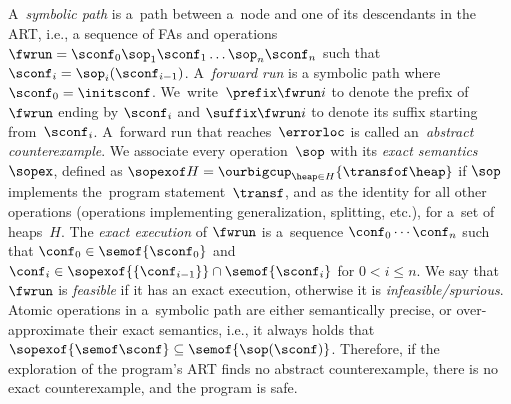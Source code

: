 A~\emph{symbolic path} is a~path between a~node and one of its
descendants in the ART, i.e., a sequence of FAs and operations
$\fwrun = \sconf_0 \sop_1 \sconf_1 \ldots \sop_n \sconf_n$
such that $\sconf_i = \sop_i(\sconf_{i-1})$.
A~\emph{forward run} is a symbolic path where $\sconf_0 = \initsconf$.
We~write~$\prefix \fwrun i$ to denote the prefix of~$\fwrun$ ending by $\sconf_i$ and 
$\suffix \fwrun i$ to denote its suffix starting from~$\sconf_i$. 
%
A~forward run that reaches~$\errorloc$ is called an~\emph{abstract
counterexample}.
We associate every operation~$\sop$ with its \emph{exact semantics} $\sopex$,
defined as $\sopexof H = \ourbigcup_{\heap \in H}\{\transfof \heap\}$
if $\sop$ implements the~program statement~$\transf$,
and as the identity for all other operations (operations implementing
generalization, splitting, etc.), for a~set of heaps~$H$.
%
The \emph{exact execution} of $\fwrun$ is a~sequence $\conf_0\cdots\conf_n$
such that 
$\conf_0\in \semof{\sconf_0}$ and    
$\conf_i\in\sopexof{\{\conf_{i-1}\}}\cap\semof{\sconf_i}$ for $0 < i\leq n$.
%
We say that $\fwrun$ is \emph{feasible} if it has an exact execution, 
otherwise it is \emph{infeasible/spurious}.
Atomic operations in a~symbolic path are either semantically precise, or over-approximate
their exact semantics, i.e.,
it always holds that $\sopexof{\semof \sconf} \subseteq \semof{\sop(\sconf)}$.
Therefore,
if the exploration of the program's ART finds no abstract counterexample, there
is no exact counterexample, and
the program is safe.



